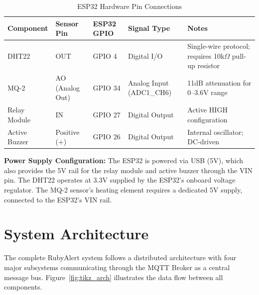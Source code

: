 \documentclass[12pt,a4paper]{report}
\begin{document}
\begin{table}[H]
    \centering
    \small
    \setlength{\tabcolsep}{4pt}
    \renewcommand{\arraystretch}{1.25}
    \begin{tabularx}{\textwidth}{|>{\raggedright\arraybackslash}p{2.2cm}|>{\raggedright\arraybackslash}p{2.1cm}|>{\raggedright\arraybackslash}p{1.7cm}|>{\raggedright\arraybackslash}p{2.6cm}|X|}
        \hline
        \textbf{Component} & \textbf{Sensor Pin} & \textbf{ESP32 GPIO} & \textbf{Signal Type} & \textbf{Notes} \\ \hline
        DHT22 & OUT & GPIO 4 & Digital I/O & Single-wire protocol; requires 10k$\Omega$ pull-up resistor \\ \hline
        MQ-2 & AO (Analog Out) & GPIO 34 & Analog Input (ADC1\_CH6) & 11dB attenuation for 0--3.6V range \\ \hline
        Relay Module & IN & GPIO 27 & Digital Output & Active HIGH configuration \\ \hline
        Active Buzzer & Positive (+) & GPIO 26 & Digital Output & Internal oscillator; DC-driven \\ \hline
    \end{tabularx}
    \caption{ESP32 Hardware Pin Connections}
    \label{tab:pinout}
\end{table}

\textbf{Power Supply Configuration:} The ESP32 is powered via USB (5V), which also provides the 5V rail for the relay module and active buzzer through the VIN pin. The DHT22 operates at 3.3V supplied by the ESP32's onboard voltage regulator. The MQ-2 sensor's heating element requires a dedicated 5V supply, connected to the ESP32's VIN rail.

\section{System Architecture}
\label{sec:architecture}
The complete RubyAlert system follows a distributed architecture with four major subsystems communicating through the MQTT Broker as a central message bus. Figure~\ref{fig:tikz_arch} illustrates the data flow between all components.
\end{document}
